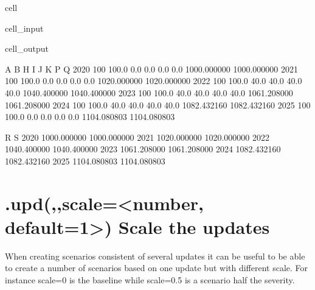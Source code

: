 \documentclass[letterpaper,10pt,english]{jupyterBook}
\begin{document}
\begin{sphinxuseclass}{cell}\begin{sphinxVerbatimInput}

\begin{sphinxuseclass}{cell_input}
\begin{sphinxVerbatim}[commandchars=\\\{\}]
\end{sphinxVerbatim}

\end{sphinxuseclass}\end{sphinxVerbatimInput}
\begin{sphinxVerbatimOutput}

\begin{sphinxuseclass}{cell_output}
\begin{sphinxVerbatim}[commandchars=\\\{\}]
        A      B     H     I     J     K            P            Q  \PYGZbs{}
2020  100  100.0   0.0   0.0   0.0   0.0  1000.000000  1000.000000   
2021  100  100.0   0.0   0.0   0.0   0.0  1020.000000  1020.000000   
2022  100  100.0  40.0  40.0  40.0  40.0  1040.400000  1040.400000   
2023  100  100.0  40.0  40.0  40.0  40.0  1061.208000  1061.208000   
2024  100  100.0  40.0  40.0  40.0  40.0  1082.432160  1082.432160   
2025  100  100.0   0.0   0.0   0.0   0.0  1104.080803  1104.080803   

                R            S  
2020  1000.000000  1000.000000  
2021  1020.000000  1020.000000  
2022  1040.400000  1040.400000  
2023  1061.208000  1061.208000  
2024  1082.432160  1082.432160  
2025  1104.080803  1104.080803  
\end{sphinxVerbatim}

\end{sphinxuseclass}\end{sphinxVerbatimOutput}

\end{sphinxuseclass}

\section{.upd(,,scale=<number, default=1>) Scale the updates}
\label{\detokenize{content/howto/update/model update:upd-scale-number-default-1-scale-the-updates}}
\sphinxAtStartPar
When creating scenarios consistent of several updates it can be useful to be able to create
a number of scenarios based on one update but with different scale. For instance scale=0 is the baseline while scale=0.5 is a scenario half
the severity.
\end{document}
